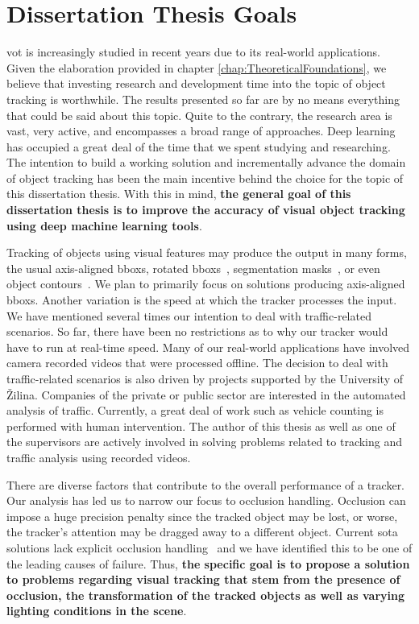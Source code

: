 \chapter{Dissertation Thesis Goals}
\label{chap:Goals}

\Gls{vot} is increasingly studied in recent years due to its real-world applications. Given the elaboration provided in chapter \ref{chap:TheoreticalFoundations}, we believe that investing research and development time into the topic of object tracking is worthwhile. The results presented so far are by no means everything that could be said about this topic. Quite to the contrary, the research area is vast, very active, and encompasses a broad range of approaches. Deep learning has occupied a great deal of the time that we spent studying and researching. The intention to build a working solution and incrementally advance the domain of object tracking has been the main incentive behind the choice for the topic of this dissertation thesis. With this in mind, \textbf{the general goal of this dissertation thesis is to improve the accuracy of visual object tracking using deep machine learning tools}.

Tracking of objects using visual features may produce the output in many forms, the usual axis-aligned \glspl{bbox}, rotated \glspl{bbox}~\cite{Chen2019}, segmentation masks~\cite{Wang2019}, or even object contours~\cite{Yang2016}. We plan to primarily focus on solutions producing axis-aligned \glspl{bbox}. Another variation is the speed at which the tracker processes the input. We have mentioned several times our intention to deal with traffic-related scenarios. So far, there have been no restrictions as to why our tracker would have to run at real-time speed. Many of our real-world applications have involved camera recorded videos that were processed offline. The decision to deal with traffic-related scenarios is also driven by projects supported by the University of Žilina. Companies of the private or public sector are interested in the automated analysis of traffic. Currently, a great deal of work such as vehicle counting is performed with human intervention. The author of this thesis as well as one of the supervisors are actively involved in solving problems related to tracking and traffic analysis using recorded videos.

There are diverse factors that contribute to the overall performance of a tracker. Our analysis has led us to narrow our focus to occlusion handling. Occlusion can impose a huge precision penalty since the tracked object may be lost, or worse, the tracker's attention may be dragged away to a different object. Current \gls{sota} solutions lack explicit occlusion handling~\cite{Guo2019, Li2018, Wang2019} and we have identified this to be one of the leading causes of failure. Thus, \textbf{the specific goal is to propose a solution to problems regarding visual tracking that stem from the presence of occlusion, the transformation of the tracked objects as well as varying lighting conditions in the scene}.

